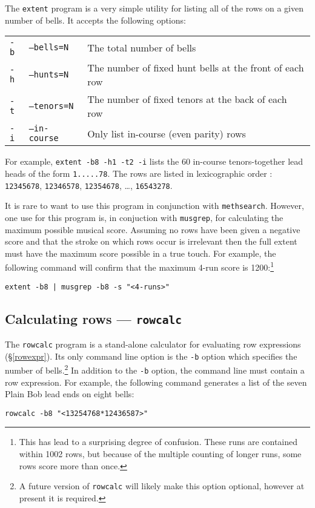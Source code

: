\documentclass[a4paper,11pt,oneside]{book}
\makeatletter
\newcommand{\ttcmdidx}[1]{\texttt{#1}\index{#1@{\texttt{#1}}}}
\def\methsearch{\texttt{meth\-search}}
\newcommand{\sref}[1]{\hyperref[#1]{\S\ref{#1}}}
\makeatother
\begin{document}
The \ttcmdidx{extent} program is a very simple utility for listing all
of the rows on a given number of bells.  It accepts the following options:

\begin{tabularx}{\textwidth}{llX}
\texttt{-b}&\texttt{--bells=N}&The total number of bells\\
\texttt{-h}&\texttt{--hunts=N}&The number of fixed hunt bells at the front
  of each row\\
\texttt{-t}&\texttt{--tenors=N}&The number of fixed tenors at the back 
  of each row\\
\texttt{-i}&\texttt{--in-course}&Only list in-course (even parity) rows\\
\end{tabularx}

For example, \verb+extent -b8 -h1 -t2 -i+ lists the 60{} 
in-course tenors-together lead heads
of the form \verb+1.....78+.  The rows are listed in lexicographic order%
: \verb+12345678+, \verb+12346578+, 
\verb+12354678+, \ldots, \verb+16543278+.

It is rare to want to use this program in conjunction with \methsearch.
However, one use for this program is, in conjuction with \texttt{musgrep}, for
calculating the maximum possible musical score.  Assuming no rows 
have been given a negative score and that the stroke on which rows occur
is irrelevant then the full extent must have the maximum score possible
in a true touch.
For example, the following command will confirm that the maximum 4-run score
is 1200:\footnote{This has lead to a surprising degree of confusion.  These
runs are contained within 1002 rows, but because of the multiple counting of
longer runs, some rows score more than once.}
\begin{Verbatim}
extent -b8 | musgrep -b8 -s "<4-runs>" 
\end{Verbatim}


\subsection{Calculating rows — \texttt{rowcalc}}\label{rowcalc}

The \ttcmdidx{rowcalc} program is a stand-alone calculator for evaluating
row expressions (\sref{rowexpr}).  Its only
command line option is the \verb+-b+ option which specifies the number
of bells.\footnote{A future version of \texttt{rowcalc} will likely 
make this option optional, however at present it is required.}
In addition to the \verb+-b+ option, the command line must contain a 
row expression.  For example, the following command generates a list
of the seven Plain Bob lead ends on eight bells:
\begin{Verbatim}
rowcalc -b8 "<13254768*12436587>"
\end{Verbatim}
\end{document}
